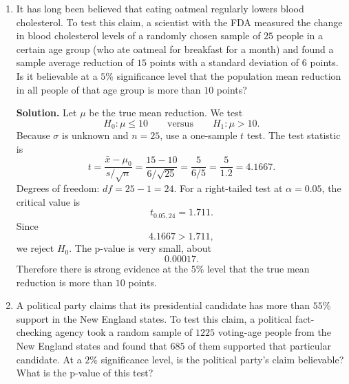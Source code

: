 \documentclass[12pt]{article}
\begin{document}
\begin{enumerate}[label=(\arabic*), leftmargin=*]
\begin{enumerate}[label=(\alph*)]
    \item \textbf{Placebo group:} $n=23$, $\bar x=8.1$, $s=1.8$. The degrees of freedom are $22$, so $t_{0.025,22}=2.074$.
    \[
    SE=\frac{s}{\sqrt n}=\frac{1.8}{\sqrt{23}}\approx 0.3753.
    \]
    Margin of error:
    \[
    ME=2.074(0.3753)\approx 0.7784.
    \]
    Therefore the interval is
    \[
    8.1\pm 0.7784,
    \]
    so the $95\%$ confidence interval is
    \[
    (7.32,\ 8.88)\text{ days}.
    \]

    \item The zinc interval is $(3.84,5.16)$ and the placebo interval is $(7.32,8.88)$. The intervals do not overlap, so there is evidence that the two population means differ. In particular, the zinc group appears to have a smaller true mean duration of symptoms.
\end{enumerate}

\item It has long been believed that eating oatmeal regularly lowers blood cholesterol. To test this claim, a scientist with the FDA measured the change in blood cholesterol levels of a randomly chosen sample of $25$ people in a certain age group (who ate oatmeal for breakfast for a month) and found a sample average reduction of $15$ points with a standard deviation of $6$ points. Is it believable at a $5\%$ significance level that the population mean reduction in all people of that age group is more than $10$ points?

\par\medskip
\noindent\textbf{Solution.}
Let $\mu$ be the true mean reduction. We test
\[
H_0:\mu\le 10
\qquad\text{versus}\qquad
H_1:\mu>10.
\]
Because $\sigma$ is unknown and $n=25$, use a one-sample $t$ test.
The test statistic is
\[
t=\frac{\bar x-\mu_0}{s/\sqrt n}
=\frac{15-10}{6/\sqrt{25}}
=\frac{5}{6/5}
=\frac{5}{1.2}
=4.1667.
\]
Degrees of freedom: $df=25-1=24$.
For a right-tailed test at $\alpha=0.05$, the critical value is
\[
t_{0.05,24}=1.711.
\]
Since
\[
4.1667>1.711,
\]
we reject $H_0$.
The p-value is very small, about
\[
0.00017.
\]
Therefore there is strong evidence at the $5\%$ level that the true mean reduction is more than $10$ points.

\item A political party claims that its presidential candidate has more than $55\%$ support in the New England states. To test this claim, a political fact-checking agency took a random sample of $1225$ voting-age people from the New England states and found that $685$ of them supported that particular candidate. At a $2\%$ significance level, is the political party's claim believable? What is the p-value of this test?


\end{enumerate}
\end{document}

